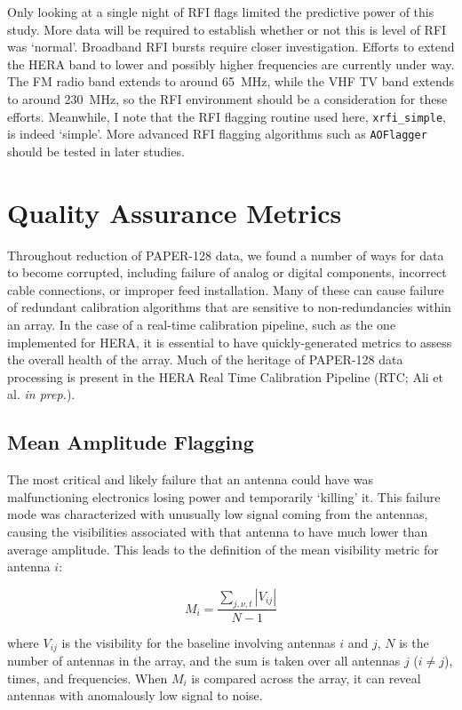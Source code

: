 Only looking at a single night of RFI flags limited the predictive power of this study. More data will be required to establish whether or not this is level of RFI was `normal'. Broadband RFI bursts require closer investigation.
Efforts to extend the HERA band to lower and possibly higher frequencies are currently under way. The FM radio band extends to around 65~MHz, while the VHF TV band extends to around 230~MHz, so the RFI environment should be a consideration for these efforts.
Meanwhile, I note that the RFI flagging routine used here, {\tt xrfi\_simple}, is indeed `simple'. More advanced RFI flagging algorithms such as {\tt AOFlagger} \citep{AOflag} should be tested in later studies.

\section{Quality Assurance Metrics}

Throughout reduction of PAPER-128 data, we found a number of ways for data to become corrupted, including failure of analog or digital components, incorrect cable connections, or improper feed installation. Many of these can cause failure of redundant calibration algorithms that are sensitive to non-redundancies within an array. In the case of a real-time calibration pipeline, such as the one implemented for HERA, it is essential to have quickly-generated metrics to assess the overall health of the array. Much of the heritage of PAPER-128 data processing is present in the HERA Real Time Calibration Pipeline (RTC; Ali et al. \textit{in prep.}).

\subsection{Mean Amplitude Flagging}
\label{subsec:meanvij}

The most critical and likely failure that an antenna could have was malfunctioning electronics losing power and temporarily `killing' it.
This failure mode was characterized with unusually low signal coming from the antennas, causing the visibilities
associated with that antenna to have much lower than average amplitude. This
leads to the definition of the mean visibility metric for antenna ${i}$:

\begin{equation}
    M_{i} = \frac{ \sum_{j,\nu,t} {|V_{ij}|} }{N-1}
\label{eq:meanvij}
\end{equation}

where $V_{ij}$ is the visibility for the baseline involving antennas $i$ and
$j$, $N$ is the number of antennas in the array, and the sum is taken over all
antennas $j$ ($i \neq j$), times, and frequencies. When $M_{i}$ is compared across the array, 
it can reveal antennas with anomalously low signal to noise.

